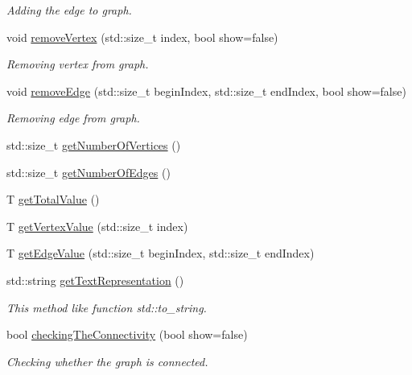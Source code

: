 \begin{DoxyCompactItemize}
\begin{DoxyCompactList}\small\item\em Adding the edge to graph. \end{DoxyCompactList}\item 
void \mbox{\hyperlink{classgs_1_1_graph_structure_a3ce672fa2de3985fba1d1111efad2878}{remove\+Vertex}} (std\+::size\+\_\+t index, bool show=false)
\begin{DoxyCompactList}\small\item\em Removing vertex from graph. \end{DoxyCompactList}\item 
void \mbox{\hyperlink{classgs_1_1_graph_structure_aa27a2bd0421823f44ac670b691cedcbd}{remove\+Edge}} (std\+::size\+\_\+t begin\+Index, std\+::size\+\_\+t end\+Index, bool show=false)
\begin{DoxyCompactList}\small\item\em Removing edge from graph. \end{DoxyCompactList}\item 
std\+::size\+\_\+t \mbox{\hyperlink{classgs_1_1_graph_structure_a973bb790243cd98bceac6188a79f47d6}{get\+Number\+Of\+Vertices}} ()
\item 
std\+::size\+\_\+t \mbox{\hyperlink{classgs_1_1_graph_structure_ab7f63de5d83e392689eb9e10f776c848}{get\+Number\+Of\+Edges}} ()
\item 
T \mbox{\hyperlink{classgs_1_1_graph_structure_a430f8d15cb01da7f7c7054b7a9e831ee}{get\+Total\+Value}} ()
\item 
T \mbox{\hyperlink{classgs_1_1_graph_structure_a0adafe2cbe3eb635da12957b9b0ad803}{get\+Vertex\+Value}} (std\+::size\+\_\+t index)
\item 
T \mbox{\hyperlink{classgs_1_1_graph_structure_ac2e23f51a131b5a08d96cb8c75f20cea}{get\+Edge\+Value}} (std\+::size\+\_\+t begin\+Index, std\+::size\+\_\+t end\+Index)
\item 
std\+::string \mbox{\hyperlink{classgs_1_1_graph_structure_afbecaabb4707e21a0018556100384e8f}{get\+Text\+Representation}} ()
\begin{DoxyCompactList}\small\item\em This method like function std\+::to\+\_\+string. \end{DoxyCompactList}\item 
bool \mbox{\hyperlink{classgs_1_1_graph_structure_a969a88dd678fd5b16884a6ab2cb68a60}{checking\+The\+Connectivity}} (bool show=false)
\begin{DoxyCompactList}\small\item\em Checking whether the graph is connected. \end{DoxyCompactList}\item 

\end{DoxyCompactItemize}
